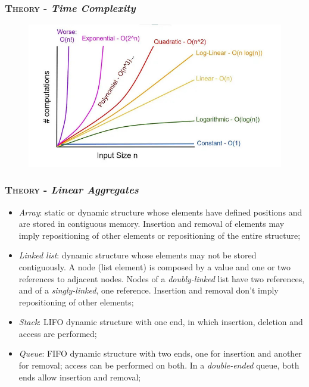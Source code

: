 \documentclass[10pt]{article}
\begin{document}
\begin{multicols*}{5}
{\subsubsection*{\textsc{Theory} - \emph{Time Complexity}} 
\begin{figure}[H]
\begin{center}
\includegraphics[scale=.21]{complexity.jpg}	
\end{center}
\end{figure}

\subsubsection*{\textsc{Theory} - \emph{Linear Aggregates}} 

\begin{itemize}[leftmargin=*,topsep=0.25pt]
  \setlength\itemsep{-1.8pt}
	\item \emph{Array}: static or dynamic structure whose elements have defined positions and are stored in contiguous memory. Insertion and removal of elements may imply repositioning of other elements or repositioning of the entire structure; 
	\item \emph{Linked list}: dynamic structure whose elements may not be stored contiguously. A node (list element) is composed by a value and one or two references to adjacent nodes. Nodes of a \emph{doubly-linked} list have two references, and of a \emph{singly-linked}, one reference. Insertion and removal don't imply repositioning of other elements;
	\item \emph{Stack}: LIFO dynamic structure with one end, in which insertion, deletion and access are performed;
	\item \emph{Queue}: FIFO dynamic structure with two ends, one for insertion and another for removal; access can be performed on both. In a \emph{double-ended} queue, both ends allow insertion and removal;  
\end{itemize}

}
\end{multicols*}
\end{document}
